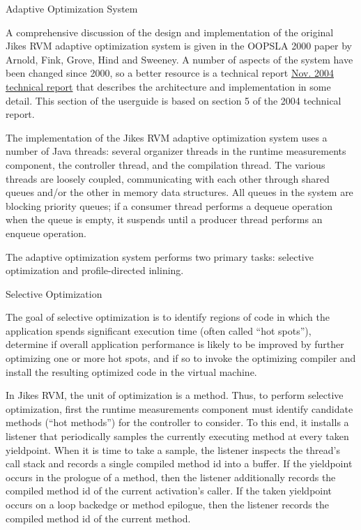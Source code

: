 \begin{chapter}{Adaptive Optimization System}
\label{cha:adaptiveoptimizationsystem}

A comprehensive discussion of the design and implementation of the original Jikes RVM adaptive optimization system is given in the OOPSLA 2000 paper by Arnold, Fink, Grove, Hind and Sweeney. A number of aspects of the system have been changed since 2000, so a better resource is a technical report \href{http://domino.research.ibm.com/library/cyberdig.nsf/1e4115aea78b6e7c85256b360066f0d4/30c2b5bb5352443885256f550066b5c1%21OpenDocument}{Nov. 2004 technical report} that describes the architecture and implementation in some detail. This section of the userguide is based on section 5 of the 2004 technical report.

The implementation of the Jikes RVM adaptive optimization system uses a number of Java threads: several organizer threads in the runtime measurements component, the controller thread, and the compilation thread. The various threads are loosely coupled, communicating with each other through shared queues and/or the other in memory data structures. All queues in the system are blocking priority queues; if a consumer thread performs a dequeue operation when the queue is empty, it suspends until a producer thread performs an enqueue operation.

The adaptive optimization system performs two primary tasks: selective optimization and profile-directed inlining.

\begin{paragraph}{Selective Optimization}

The goal of selective optimization is to identify regions of code in which the application spends significant execution time (often called ``hot spots''), determine if overall application performance is likely to be improved by further optimizing one or more hot spots, and if so to invoke the optimizing compiler and install the resulting optimized code in the virtual machine.

In Jikes RVM, the unit of optimization is a method.  Thus, to perform selective optimization, first the runtime measurements component must identify candidate methods (``hot methods'') for the controller to consider. To this end, it installs a listener that periodically samples the currently executing method at every taken yieldpoint.  When it is time to take a sample, the listener inspects the thread's call stack and records a single compiled method id into a buffer. If the yieldpoint occurs in the prologue of a method, then the listener additionally records the compiled method id of the current activation's caller.  If the taken yieldpoint occurs on a loop backedge or method epilogue, then the listener records the compiled method id of the current method. 


\end{paragraph}
\end{chapter}
